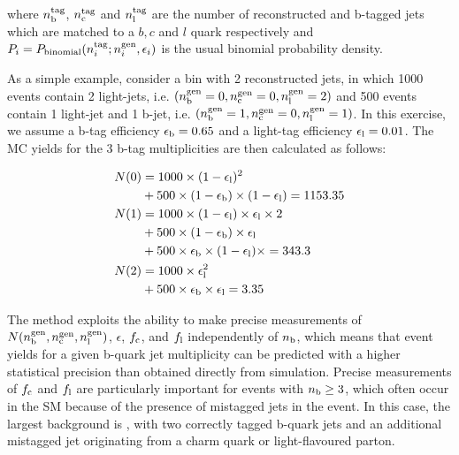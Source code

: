 where $n_{\rm b}^{\rm tag}$, $n_{\rm c}^{\rm tag}$ and $n_{\rm l}^{\rm tag}$ are the number of reconstructed and b-tagged jets 
which are matched to a $b,c$ and $l$ quark respectively and 
$P_{i} = P_{\mathrm{binomial}}(n_{i}^{\rm tag}; n_{i}^{\rm gen}, \epsilon_{i})$ is the usual binomial probability density.

As a simple example, consider a bin with 2 reconstructed jets, in which 
1000 events contain 2 light-jets, i.e. $(n_{\rm b}^{\rm gen} = 0,n_{\rm c}^{\rm gen} = 0,n_{\rm l}^{\rm gen} = 2)$ and 
500 events contain 1 light-jet and 1 b-jet, i.e. $(n_{\rm b}^{\rm gen} = 1,n_{\rm c}^{\rm gen} = 0,n_{\rm l}^{\rm gen} = 1)$. 
In this exercise, we assume a b-tag efficiency $\epsilon_{\rm b} = 0.65$ and a light-tag efficiency $\epsilon_{\rm l} = 0.01$. 
The MC yields for the 3 b-tag multiplicities are then calculated as follows:

\begin{align*}
N(0) &= 1000\times (1-\epsilon_{\rm l})^2 \\
     &+ 500\times (1-\epsilon_{\rm b})\times(1-\epsilon_{\rm l}) = 1153.35 \\
N(1) &= 1000\times (1-\epsilon_{\rm l})\times \epsilon_{\rm l} \times 2 \\
     &+ 500\times (1-\epsilon_{\rm b})\times\epsilon_{\rm l} \\
     &+ 500\times \epsilon_{\rm b} \times (1-\epsilon_{\rm l})\times = 343.3 \\
N(2) &= 1000\times \epsilon_{\rm l}^2 \\
     &+ 500\times \epsilon_{\rm b} \times \epsilon_{\rm l} = 3.35 \\
\end{align*}

  
The method exploits the ability to make precise measurements of
$N(n_{\rm b}^{\rm gen},n_{\rm c}^{\rm gen},n_{\rm l}^{\rm gen})$,
$\epsilon$, $f_{\rm c}$, and $f_{\rm l}$ independently of $n_{\rm
  b}$, which means that event yields for a given b-quark jet
multiplicity can be predicted with a higher statistical precision than
obtained directly from simulation. Precise measurements of $f_{\rm c}$
and $f_{\rm l}$ are particularly important for events with $n_{\rm
  b} \geq 3$, which often occur in the SM because of the presence of
mistagged jets in the event. In this case, the largest background is
\ttbar, with two correctly tagged b-quark jets and an additional
mistagged jet originating from a charm quark or light-flavoured
parton.

